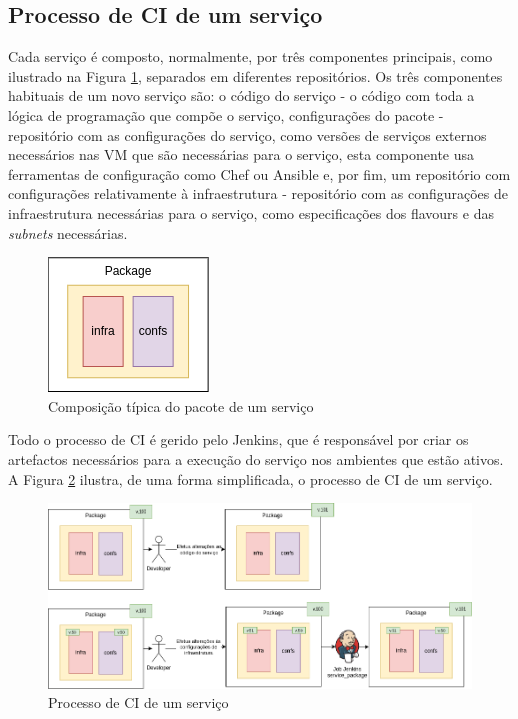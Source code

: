 \subsection{Processo de \ac{CI} de um serviço}

Cada serviço é composto, normalmente, por três componentes principais, como ilustrado na Figura
\ref{package}, separados em diferentes repositórios. Os três componentes habituais de um novo 
serviço são: o código do serviço - o código com toda a lógica de programação que compõe o serviço, 
configurações do pacote - repositório com as configurações do serviço, como versões de serviços 
externos necessários nas \ac{VM} que são necessárias para o serviço, esta componente usa 
ferramentas de configuração como Chef \cite{chef} ou Ansible \cite{ansible} e, por fim, um 
repositório com configurações relativamente à infraestrutura - repositório com as configurações de 
infraestrutura necessárias para o serviço, como especificações dos \glspl{flavour} e das 
\textit{subnets} necessárias.

\begin{figure}[H]
  \centerline{\includegraphics[scale=1.2]{media/content/impl/package.png}}
  \caption{Composição típica do pacote de um serviço}
  \label{package}
\end{figure}

Todo o processo de \ac{CI} é gerido pelo Jenkins, que é responsável por criar os artefactos
necessários para a execução do serviço nos ambientes que estão ativos. A Figura \ref{ci-process} 
ilustra, de uma forma simplificada, o processo de \ac{CI} de um serviço.

\begin{figure}[H]
  \centerline{\includegraphics[scale=0.5]{media/content/impl/ci-process.png}}
  \caption{Processo de \ac{CI} de um serviço}
  \label{ci-process}
\end{figure}


